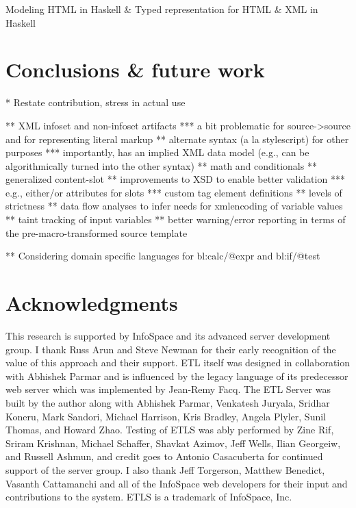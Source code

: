 \documentclass{www2003-submission}
\begin{document}
Modeling HTML in Haskell \& Typed representation for HTML \& XML in Haskell


\section{Conclusions \& future work}
\label{sec-conclusion}

* Restate contribution, stress in actual use


** XML infoset and non-infoset artifacts
*** a bit problematic for source->source and for representing literal markup
** alternate syntax (a la stylescript) for other purposes
*** importantly, has an implied XML data model (e.g., can be algorithmically turned into the other syntax)
** math and conditionals
** generalized content-slot
** improvements to XSD to enable better validation
*** e.g., either/or attributes for slots
*** custom tag element definitions
** levels of strictness
** data flow analyses to infer needs for xmlencoding of variable values
** taint tracking of input variables
** better warning/error reporting in terms of the pre-macro-transformed source template

** Considering domain specific languages for bl:calc/@expr and bl:if/@test

\section{Acknowledgments}
\label{sec-ack}
This research is supported by InfoSpace and its advanced server
development group.  I thank Russ Arun and Steve Newman for their early
recognition of the value of this approach and their support.  ETL
itself was designed in collaboration with Abhishek Parmar and is
influenced by the legacy language of its predecessor web server which
was implemented by Jean-Remy Facq.  The ETL Server was built by the
author along with Abhishek Parmar, Venkatesh Juryala, Sridhar Koneru,
Mark Sandori, Michael Harrison, Kris Bradley, Angela Plyler, Sunil
Thomas, and Howard Zhao.  Testing of ETLS was ably performed by Zine
Rif, Sriram Krishnan, Michael Schaffer, Shavkat Azimov, Jeff Wells,
Ilian Georgeiw, and Russell Ashmun, and credit goes to Antonio
Casacuberta for continued support of the server group.  I also thank
Jeff Torgerson, Matthew Benedict, Vasanth Cattamanchi and all of the
InfoSpace web developers for their input and contributions to
the system. ETLS is a trademark of InfoSpace, Inc.




%
\end{document}
